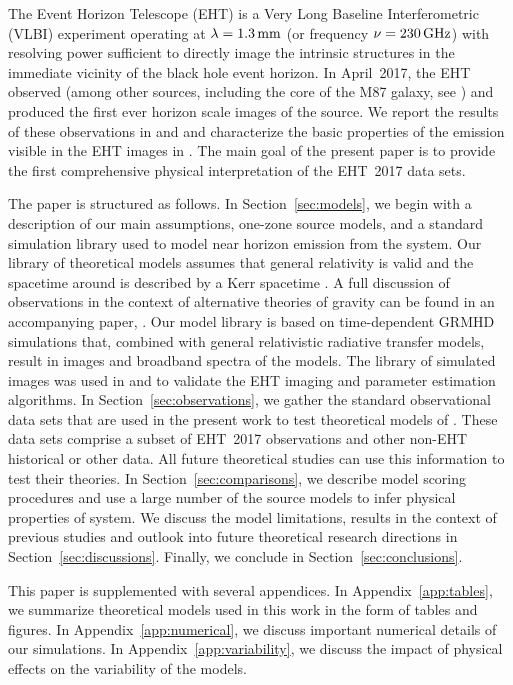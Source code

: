 The Event Horizon Telescope (EHT) is a Very Long Baseline Interferometric (VLBI) experiment operating at $\lambda = 1.3\,\mathrm{mm}$ (or frequency $\nu = 230\,\mathrm{GHz}$) with resolving power sufficient to directly image the intrinsic \sgra structures in the immediate vicinity of the black hole event horizon.
In April~2017, the EHT observed \sgra (among other sources, including the core of the M87 galaxy, see ) and produced the first ever horizon scale images of the source.
We report the results of these observations in  and  and characterize the basic properties of the emission visible in the EHT images in .
The main goal of the present paper  is to provide the first comprehensive physical interpretation of the EHT~2017 \sgra data sets.

The paper is structured as follows.
In Section~\ref{sec:models}, we begin with a description of our main assumptions, one-zone source models, and a standard simulation library used to model near horizon emission from the \sgra system.
Our library of theoretical models assumes that general relativity is valid and the spacetime around \sgra is described by a Kerr spacetime \citep{1963PhRvL..11..237K}.
A full discussion of \sgra observations in the context of alternative theories of gravity can be found in an accompanying paper, .
Our model library is based on time-dependent GRMHD simulations that, combined with general relativistic radiative transfer models, result in images and broadband spectra of the models.
The library of simulated images was used in  and  to validate the \sgra EHT imaging and parameter estimation algorithms.
In Section~\ref{sec:observations}, we gather the standard observational data sets that are used in the present work to test theoretical models of \sgra.
These data sets comprise a subset of EHT~2017 observations and other non-EHT historical or other data.
All future theoretical studies can use this information to test their theories.
In Section~\ref{sec:comparisons}, we describe model scoring procedures and use a large number of the source models to infer physical properties of \sgra system.
We discuss the model limitations, results in the context of previous studies and outlook into future \sgra theoretical research directions in Section~\ref{sec:discussions}.
Finally, we conclude in Section~\ref{sec:conclusions}.

This paper is supplemented with several appendices.
In Appendix~\ref{app:tables},      we summarize theoretical models used in this work in the form of tables and figures.
In Appendix~\ref{app:numerical},   we discuss important numerical details of our simulations.
In Appendix~\ref{app:variability}, we discuss the impact of physical effects on the variability of the models.
